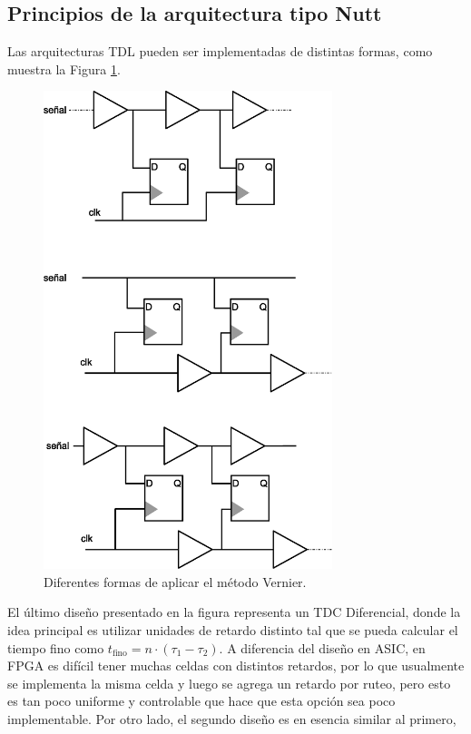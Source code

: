 \subsection{Principios de la arquitectura tipo Nutt}
Las arquitecturas TDL pueden ser implementadas de distintas formas, como muestra la Figura \ref{fig: various_tdl}.
\begin{figure}[H]
     \centering
     \includegraphics[width=0.75\textwidth]{imagenes/various_tdl.eps}
     \caption{Diferentes formas de aplicar el método Vernier.}
     \label{fig: various_tdl}
\end{figure}
El último diseño presentado en la figura representa un TDC Diferencial, donde la
idea principal es utilizar unidades de retardo distinto tal que se pueda calcular
el tiempo fino como $t_\text{fino} = n \cdot (\tau_1 - \tau_2)$. A diferencia 
del diseño en ASIC, en FPGA es difícil
tener muchas celdas con distintos retardos, por lo que usualmente se implementa la misma celda
y luego se agrega un retardo por ruteo, pero esto es tan poco uniforme y controlable que 
hace que esta opción sea poco implementable. Por otro lado, el segundo diseño es en esencia similar al primero, 
